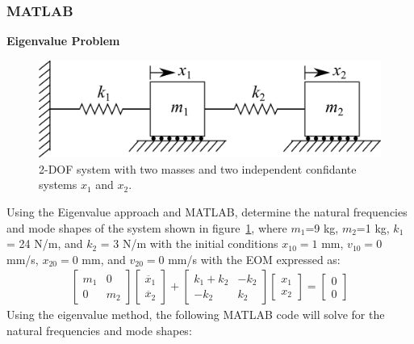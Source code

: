\documentclass[12pt,letter]{article}
\begin{document}
	
	
	
	
	
	\subsubsection{MATLAB}
	
	\begin{example}
	\textbf{Eigenvalue Problem}
	
	\begin{figure}[H]
		\centering
		\includegraphics[]{../figures/2-DOF-spring_mass_horizontal.png}
		\caption{2-DOF system with two masses and two independent confidante systems $x_1$ and $x_2$.}
		\label{fig:2-DOF-spring_mass_horizontal_2}
	\end{figure}
	
	Using the Eigenvalue approach and MATLAB, determine the natural frequencies and mode shapes of the system shown in figure~\ref{fig:2-DOF-spring_mass_horizontal_2}, where $m_1$=9 kg, $m_2$=1 kg, $k_1$ = 24 N/m, and $k_2$ = 3 N/m with the initial conditions $x_{10}=1$ mm, $v_{10}=0$ mm/s, $x_{20}=0$ mm, and $v_{20}=0$ mm/s with the EOM expressed as: 
	\begin{eqnarray}
	  \begin{bmatrix} m_1 & 0  \\  0 & m_2 \end{bmatrix}\begin{bmatrix} \ddot{x_1} \\  \ddot{x_2} \end{bmatrix} + \begin{bmatrix} k_1+k_2 & -k_2  \\  -k_2 & k_2 \end{bmatrix}\begin{bmatrix} x_1 \\  x_2 \end{bmatrix} = \begin{bmatrix} 0 \\  0 \end{bmatrix}
	\end{eqnarray}
	Using the eigenvalue method, the following MATLAB code will solve for the natural frequencies and mode shapes:
	

\end{example}
\end{document}
